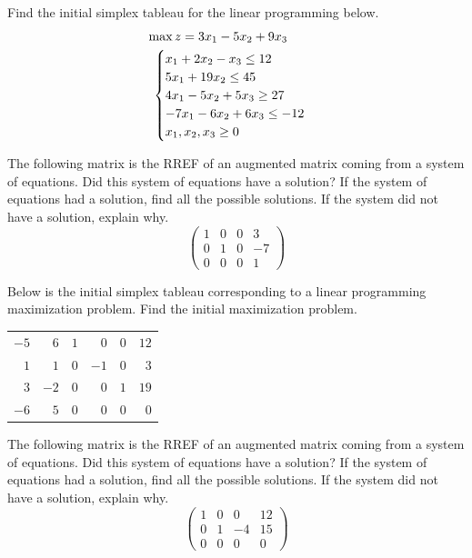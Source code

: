 \documentclass[12pt,letterpaper]{exam}
\begin{document}
\begin{questions}
\newpage
\question[10] Find the initial simplex tableau for the linear programming below. 
	\[
	\begin{gathered}
	\hspace{-1cm} \max z= 3x_1 - 5x_2 + 9x_3 \\
	\begin{cases}
	x_1 + 2x_2 - x_3 \leq 12 \\
	5x_1 + 19x_2 \leq 45 \\
	4x_1 - 5x_2 + 5x_3 \geq 27 \\
	-7x_1 - 6x_2 + 6x_3 \leq -12 \\
	x_1, x_2, x_3 \geq 0
	\end{cases}
	\end{gathered}
	\]



\newpage
\question[10] The following matrix is the RREF of an augmented matrix coming from a system of equations. Did this system of equations have a solution? If the system of equations had a solution, find all the possible solutions. If the system did not have a solution, explain why. 
	\[
	\begin{pmatrix}
	1 & 0 & 0 & 3 \\
	0 & 1 & 0 & -7 \\
	0 & 0 & 0 & 1 
	\end{pmatrix}
	\]



\newpage
\question[10] Below is the initial simplex tableau corresponding to a linear programming maximization problem. Find the initial maximization problem. \par
	\begin{table}[H]
	\centering
	\begin{tabular}{rrrrrr}
	$-5$ & $6$ & $1$ & $0$ & $0$ & $12$ \\
	$1$ & $1$ & $0$ & $-1$ & $0$ & $3$ \\
	$3$ & $-2$ & $0$ & $0$ & $1$ & $19$ \\
	$-6$ & $5$ & $0$ & $0$ & $0$ & $0$ 
	\end{tabular}
	\end{table} \pspace



\newpage
\question[10] The following matrix is the RREF of an augmented matrix coming from a system of equations. Did this system of equations have a solution? If the system of equations had a solution, find all the possible solutions. If the system did not have a solution, explain why. 
	\[
	\begin{pmatrix}
	1 & 0 & 0 & 12 \\
	0 & 1 & -4 & 15 \\
	0 & 0 & 0 & 0 
	\end{pmatrix}
	\]




\end{questions}
\end{document}
